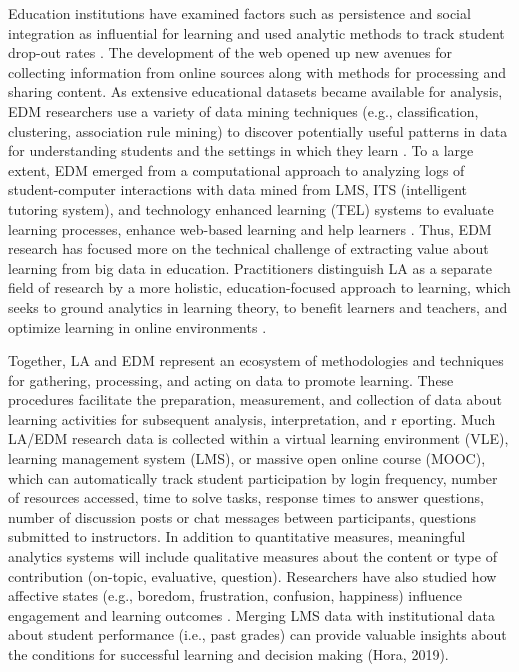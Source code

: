 \documentclass[sigconf]{acmart}
\begin{document}

Education institutions have examined factors such as persistence and social 
integration as influential for learning and used analytic methods to track 
student drop-out rates \cite{ferguson12}. The development of the web opened 
up new avenues for collecting information from online sources along with methods 
for processing and sharing content. As extensive educational datasets became 
available for analysis, EDM researchers use a variety of data mining techniques 
(e.g., classification, clustering, association rule mining) to discover 
potentially useful patterns in data for understanding students and the settings 
in which they learn \cite{bakerYucef09}. To a large extent, EDM emerged from 
a computational approach to analyzing logs of student-computer interactions with
data mined from LMS, ITS (intelligent tutoring system), and technology enhanced 
learning (TEL) systems to evaluate learning processes, enhance web-based learning 
and help learners \cite{penaAyala14, romero10}. Thus, EDM research has focused 
more on the technical challenge of extracting value about learning from big data 
in education. Practitioners distinguish LA as a separate field of research by a 
more holistic, education-focused approach to learning, which seeks to ground 
analytics in learning theory, to benefit learners and teachers, and optimize 
learning in online environments \cite{lang17, papamitsiou14}. 


Together, LA and EDM represent an ecosystem of methodologies and techniques 
for gathering, processing, and acting on data to promote learning. These 
procedures facilitate the preparation, measurement, and collection of data 
about learning activities for subsequent analysis, interpretation, and r
eporting. Much LA/EDM research data is collected within a virtual learning 
environment (VLE), learning management system (LMS), or massive open online 
course (MOOC), which can automatically track student participation by login 
frequency, number of resources accessed, time to solve tasks, response times 
to answer questions, number of discussion posts or chat messages between 
participants, questions submitted to instructors. In addition to quantitative 
measures, meaningful analytics systems will include qualitative measures about 
the content or type of contribution (on-topic, evaluative, question). 
Researchers have also studied how affective states (e.g., boredom, 
frustration, confusion, happiness) influence engagement and learning outcomes 
\cite{pardos14}. Merging LMS data with institutional data about student 
performance (i.e., past grades) can provide valuable insights about the 
conditions for successful learning and decision making (Hora, 2019). 
\end{document}
